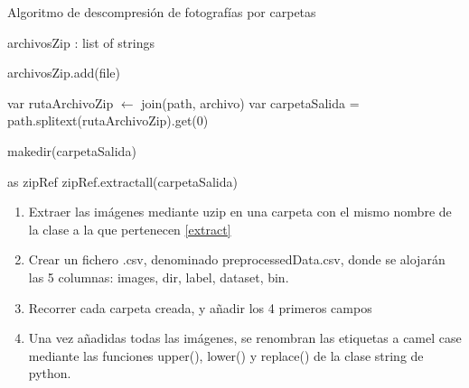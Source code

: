  
 \begin{algorithm}[H]
 	\label{extract}
 	\caption{Algoritmo de descompresión de fotografías por carpetas}
 	\begin{algorithmic}[1]
 		
 		 		\State archivosZip : list of strings
 		 		
 			\State archivosZip.add(file)
 		\EndFor

			\State var rutaArchivoZip  $\gets$ join(path, archivo)
			\State var carpetaSalida = path.splitext(rutaArchivoZip).get(0) 
		
				\State makedir(carpetaSalida) 

			\State {} as zipRef
			\State zipRef.extractall(carpetaSalida)
			 \EndIf
		\EndFor
 		\EndProcedure
 		
 	\end{algorithmic}
 \end{algorithm}
 
 


\begin{enumerate}
	\item Extraer las imágenes mediante uzip en una carpeta con el mismo nombre de la clase a la que pertenecen \ref{extract}
	\item Crear un fichero .csv, denominado preprocessedData.csv, donde se alojarán las 5 columnas: images, dir, label, dataset, bin.
	\item Recorrer cada carpeta creada, y añadir los 4 primeros campos
	\item Una vez añadidas todas las imágenes, se renombran las etiquetas a camel case mediante las funciones upper(), lower() y replace() de la clase string de python.
\end{enumerate}

